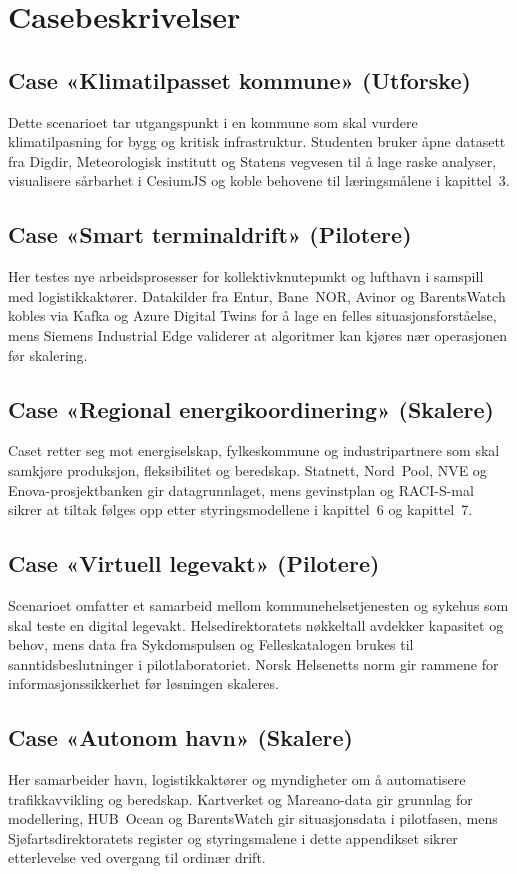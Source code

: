 \section{Casebeskrivelser}
\subsection{Case «Klimatilpasset kommune» (Utforske)}
Dette scenarioet tar utgangspunkt i en kommune som skal vurdere klimatilpasning for bygg og kritisk infrastruktur. Studenten bruker åpne datasett fra Digdir, Meteorologisk institutt og Statens vegvesen til å lage raske analyser, visualisere sårbarhet i CesiumJS og koble behovene til læringsmålene i kapittel~3.

\subsection{Case «Smart terminaldrift» (Pilotere)}
Her testes nye arbeidsprosesser for kollektivknutepunkt og lufthavn i samspill med logistikkaktører. Datakilder fra Entur, Bane~NOR, Avinor og BarentsWatch kobles via Kafka og Azure Digital Twins for å lage en felles situasjonsforståelse, mens Siemens Industrial Edge validerer at algoritmer kan kjøres nær operasjonen før skalering.

\subsection{Case «Regional energikoordinering» (Skalere)}
Caset retter seg mot energiselskap, fylkeskommune og industripartnere som skal samkjøre produksjon, fleksibilitet og beredskap. Statnett, Nord~Pool, NVE og Enova-prosjektbanken gir datagrunnlaget, mens gevinstplan og RACI-S-mal sikrer at tiltak følges opp etter styringsmodellene i kapittel~6 og kapittel~7.

\subsection{Case «Virtuell legevakt» (Pilotere)}
Scenarioet omfatter et samarbeid mellom kommunehelsetjenesten og sykehus som skal teste en digital legevakt. Helsedirektoratets nøkkeltall avdekker kapasitet og behov, mens data fra Sykdomspulsen og Felleskatalogen brukes til sanntidsbeslutninger i pilotlaboratoriet. Norsk Helsenetts norm gir rammene for informasjonssikkerhet før løsningen skaleres.

\subsection{Case «Autonom havn» (Skalere)}
Her samarbeider havn, logistikkaktører og myndigheter om å automatisere trafikkavvikling og beredskap. Kartverket og Mareano-data gir grunnlag for modellering, HUB~Ocean og BarentsWatch gir situasjonsdata i pilotfasen, mens Sjøfartsdirektoratets register og styringsmalene i dette appendikset sikrer etterlevelse ved overgang til ordinær drift.

